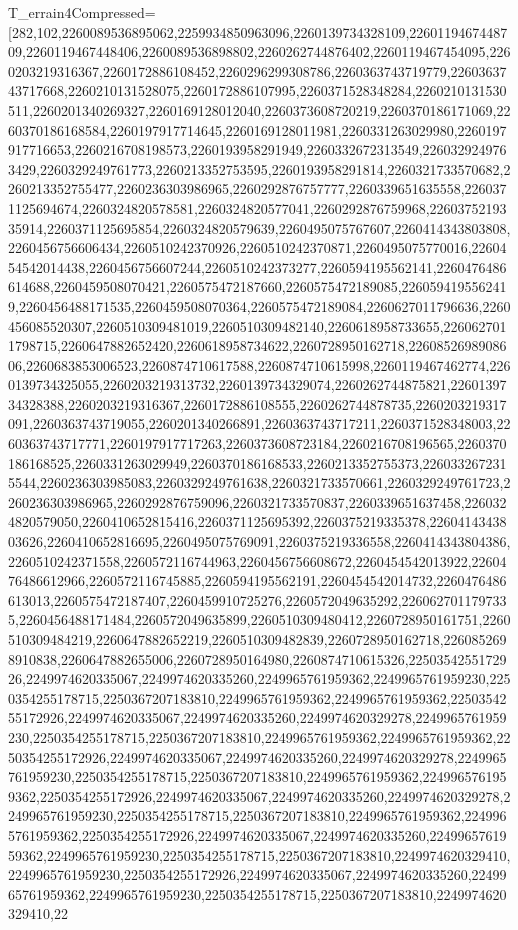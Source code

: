 T_{errain4Compressed}=\left[282,102,2260089536895062,2259934850963096,2260139734328109,2260119467448709,2260119467448406,2260089536898802,2260262744876402,2260119467454095,2260203219316367,2260172886108452,2260296299308786,2260363743719779,2260363743717668,2260210131528075,2260172886107995,2260371528348284,2260210131530511,2260201340269327,2260169128012040,2260373608720219,2260370186171069,2260370186168584,2260197917714645,2260169128011981,2260331263029980,2260197917716653,2260216708198573,2260193958291949,2260332672313549,2260329249763429,2260329249761773,2260213352753595,2260193958291814,2260321733570682,2260213352755477,2260236303986965,2260292876757777,2260339651635558,2260371125694674,2260324820578581,2260324820577041,2260292876759968,2260375219335914,2260371125695854,2260324820579639,2260495075767607,2260414343803808,2260456756606434,2260510242370926,2260510242370871,2260495075770016,2260454542014438,2260456756607244,2260510242373277,2260594195562141,2260476486614688,2260459508070421,2260575472187660,2260575472189085,2260594195562419,2260456488171535,2260459508070364,2260575472189084,2260627011796636,2260456085520307,2260510309481019,2260510309482140,2260618958733655,2260627011798715,2260647882652420,2260618958734622,2260728950162718,2260852698908606,2260683853006523,2260874710617588,2260874710615998,2260119467462774,2260139734325055,2260203219313732,2260139734329074,2260262744875821,2260139734328388,2260203219316367,2260172886108555,2260262744878735,2260203219317091,2260363743719055,2260201340266891,2260363743717211,2260371528348003,2260363743717771,2260197917717263,2260373608723184,2260216708196565,2260370186168525,2260331263029949,2260370186168533,2260213352755373,2260332672315544,2260236303985083,2260329249761638,2260321733570661,2260329249761723,2260236303986965,2260292876759096,2260321733570837,2260339651637458,2260324820579050,2260410652815416,2260371125695392,2260375219335378,2260414343803626,2260410652816695,2260495075769091,2260375219336558,2260414343804386,2260510242371558,2260572116744963,2260456756608672,2260454542013922,2260476486612966,2260572116745885,2260594195562191,2260454542014732,2260476486613013,2260575472187407,2260459910725276,2260572049635292,2260627011797335,2260456488171484,2260572049635899,2260510309480412,2260728950161751,2260510309484219,2260647882652219,2260510309482839,2260728950162718,2260852698910838,2260647882655006,2260728950164980,2260874710615326,2250354255172926,2249974620335067,2249974620335260,2249965761959362,2249965761959230,2250354255178715,2250367207183810,2249965761959362,2249965761959362,2250354255172926,2249974620335067,2249974620335260,2249974620329278,2249965761959230,2250354255178715,2250367207183810,2249965761959362,2249965761959362,2250354255172926,2249974620335067,2249974620335260,2249974620329278,2249965761959230,2250354255178715,2250367207183810,2249965761959362,2249965761959362,2250354255172926,2249974620335067,2249974620335260,2249974620329278,2249965761959230,2250354255178715,2250367207183810,2249965761959362,2249965761959362,2250354255172926,2249974620335067,2249974620335260,2249965761959362,2249965761959230,2250354255178715,2250367207183810,2249974620329410,2249965761959230,2250354255172926,2249974620335067,2249974620335260,2249965761959362,2249965761959230,2250354255178715,2250367207183810,2249974620329410,22
